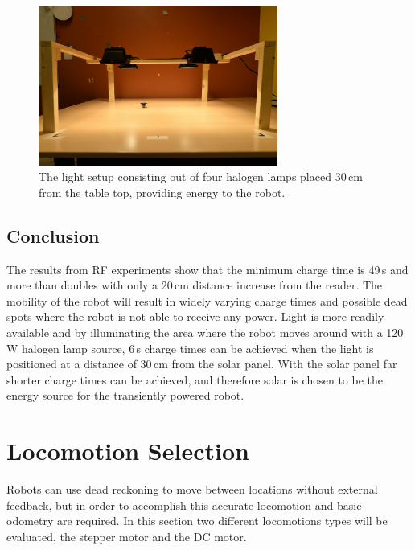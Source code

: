 \begin{figure}
	\centering
	\includegraphics[width=0.7\textwidth]{pics/light_setup.jpg}
	\caption{The light setup consisting out of four halogen lamps placed 30\,cm from the table top, providing energy to the robot.}
	\label{fig:light_setup}
\end{figure}

\subsection{Conclusion}

The results from RF experiments show that the minimum charge time is 49\,s and more than doubles with only a 20\,cm distance increase from the reader.
The mobility of the robot will result in widely varying charge times and possible dead spots where the robot is not able to receive any power.
Light is more readily available and by illuminating the area where the robot moves around with a 120\,W halogen lamp source, 6\,s charge times can be achieved when the light is positioned at a distance of 30\,cm from the solar panel.
With the solar panel far shorter charge times can be achieved, and therefore solar is chosen to be the energy source for the transiently powered robot.

\section{Locomotion Selection}
\label{sec:pre_locomotion_selection}

Robots can use dead reckoning to move between locations without external feedback, but in order to accomplish this accurate locomotion and basic odometry are required.
In this section two different locomotions types will be evaluated, the stepper motor and the DC motor.

